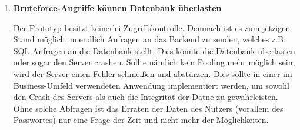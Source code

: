 \begin{enumerate}
\item \textbf{Bruteforce-Angriffe können Datenbank überlasten}

Der Prototyp besitzt keinerlei Zugriffskontrolle. Demnach ist es zum jetzigen Stand möglich, unendlich Anfragen an das Backend zu senden, welches z.B: SQL Anfragen an die Datenbank stellt. Dies könnte die Datenbank überlasten oder sogar den Server crashen. Sollte nämlich kein Pooling mehr möglich sein, wird der Server einen Fehler schmeißen und abstürzen. Dies sollte in einer im Business-Umfeld verwendeten Anwendung implementiert werden, um sowohl den Crash des Servers als auch die Integrität der Datne zu gewährleisten. Ohne solche Abfragen ist das Erraten der Daten des Nutzers (vorallem des Passwortes) nur eine Frage der Zeit und nicht mehr der Möglichkeiten.

\end{enumerate}
